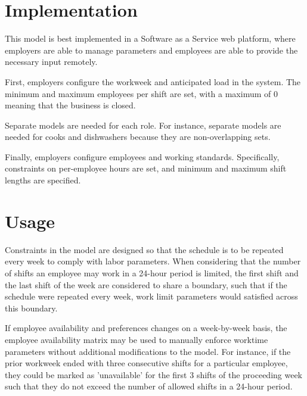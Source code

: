 \section{Implementation}

This model is best implemented in a Software as a Service web platform, where employers are able to manage parameters and employees are able to provide the necessary input remotely. 

First, employers configure the workweek and anticipated load in the system. The minimum and maximum employees per shift are set, with a maximum of 0 meaning that the business is closed. 

Separate models are needed for each role. For instance, separate models are needed for cooks and dishwashers because they are non-overlapping sets.

Finally, employers configure employees and working standards. Specifically, constraints on per-employee hours are set, and minimum and maximum shift lengths are specified. 

\section{Usage}

Constraints in the model are designed so that the schedule is to be repeated every week to comply with labor parameters. When considering that the number of shifts an employee may work in a 24-hour period is limited, the first shift and the last shift of the week are considered to share a boundary, such that if the schedule were repeated every week, work limit parameters would satisfied across this boundary. 

If employee availability and preferences changes on a week-by-week basis, the employee availability matrix may be used to manually enforce worktime parameters without additional modifications to the model. For instance, if the prior workweek ended with three consecutive shifts for a particular employee, they could be marked as 'unavailable' for the first 3 shifts of the proceeding week such that they do not exceed the number of allowed shifts in a 24-hour period.  






